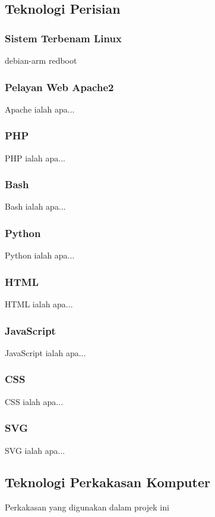 \subsection{Teknologi Perisian}

\subsubsection{Sistem Terbenam Linux}
debian-arm
redboot

\subsubsection{Pelayan Web Apache2}
Apache ialah apa...

\subsubsection{PHP}
PHP ialah apa...

\subsubsection{Bash}
Bash ialah apa...

\subsubsection{Python}
Python ialah apa...

\subsubsection{HTML}
HTML ialah apa...

\subsubsection{JavaScript}
JavaScript ialah apa...

\subsubsection{CSS}
CSS ialah apa...

\subsubsection{SVG}
SVG ialah apa...

\subsection{Teknologi Perkakasan Komputer}
Perkakasan yang digunakan dalam projek ini

